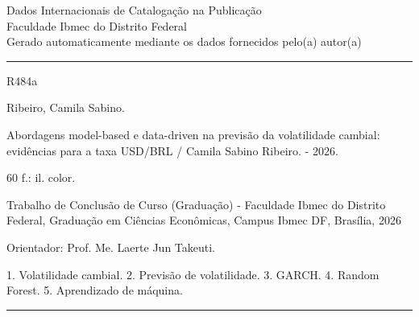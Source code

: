 \documentclass[12pt,a4paper,oneside,openany]{report}
\begin{document}
\thispagestyle{empty}
\vspace*{\fill}
\begin{center}
\begin{minipage}{\textwidth}
\footnotesize\singlespacing\centering
Dados Internacionais de Catalogação na Publicação\\
Faculdade Ibmec do Distrito Federal\\
Gerado automaticamente mediante os dados fornecidos pelo(a) autor(a)\par
\vspace{3pt}\hrule\vspace{12pt}
\raggedright
\noindent\begin{minipage}[t]{1.6cm}R484a\end{minipage}%
\begin{minipage}[t]{\dimexpr\textwidth-1.6cm\relax}
\setlength{\parindent}{0.5cm}\raggedright
\noindent Ribeiro, Camila Sabino.\par
Abordagens model-based e data-driven na previsão da volatilidade cambial:
evidências para a taxa USD/BRL / Camila Sabino Ribeiro. - 2026.\par
60 f.: il. color.\par
\vspace{\baselineskip}
Trabalho de Conclusão de Curso (Graduação) - Faculdade Ibmec do Distrito
Federal, Graduação em Ciências Econômicas, Campus Ibmec DF, Brasília, 2026\par
Orientador: Prof. Me. Laerte Jun Takeuti.\par
\vspace{\baselineskip}
1. Volatilidade cambial. 2. Previsão de volatilidade. 3. GARCH.
4. Random Forest. 5. Aprendizado de máquina.
\end{minipage}
\vspace{6pt}\hrule
\end{minipage}
\end{center}
\newpage

\newcommand{\assinatura}[2]{%
  \vspace{1.2cm}\par
  \noindent\hfill\begin{minipage}{0.8\textwidth}\centering\singlespacing
  \rule{\linewidth}{0.4pt}\par #1\par #2\end{minipage}\hfill\null\par}
\end{document}

